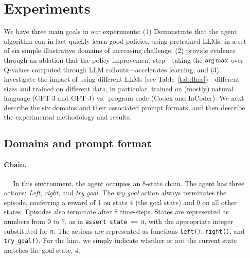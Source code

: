 \documentclass{article}
\begin{document}
\section{Experiments} %
\label{sec:experiments}

We have three main goals in our experiments: (1) Demonstrate that the agent
algorithm can in fact quickly learn good policies,  using pretrained LLMs, in a
set of six simple illustrative domains of increasing challenge; (2) provide
evidence through an ablation that the policy-improvement step---taking the
$\arg\max$ over Q-values computed through LLM rollouts---accelerates learning;
and (3) investigate the impact of using different LLMs (see
Table~\ref{tab:llms})---different sizes and trained on different data, in
particular, trained on (mostly) natural language (GPT-3 and GPT-J) vs.\ program
code (Codex and InCoder). We next describe the six domains and their
associated prompt formats, and then describe the experimental methodology and
results.

\subsection{Domains and prompt format}
\label{sec:domains-and-prompt-format}

\paragraph{Chain.}~~ In this environment, the agent occupies an 8-state chain.
The agent has three actions:  \emph{Left}, \emph{right}, and \emph{try goal}.
The \emph{try goal} action always terminates the episode, conferring a reward of
1 on state 4 (the goal state) and 0 on all other states.
Episodes also terminate after 8 time-steps. States are represented as numbers
from 0 to 7, as in \texttt{assert state == n}, with the appropriate integer
substituted for \texttt{n}. The actions are represented as functions
\texttt{left()}, \texttt{right()}, and \texttt{try\_goal()}. For the hint, we
simply indicate whether or not the current state matches the goal state, 4.
\end{document}
